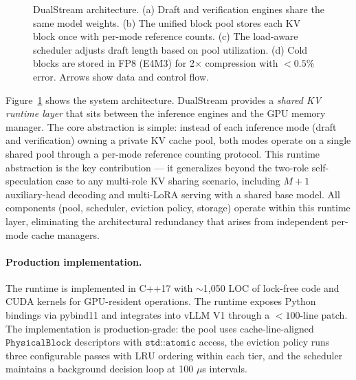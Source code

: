 \documentclass[review]{elsarticle}
\theoremstyle{definition}
\theoremstyle{remark}
\begin{document}
\begin{figure}[t]
\caption{DualStream architecture. (a) Draft and verification engines
share the same model weights. (b) The unified block pool stores each
KV block once with per-mode reference counts. (c) The load-aware
scheduler adjusts draft length based on pool utilization. (d) Cold blocks
are stored in FP8 (E4M3) for 2$\times$ compression with $<0.5\%$ error.
Arrows show data and control flow.}
\label{fig:arch}
\end{figure}

Figure~\ref{fig:arch} shows the system architecture. DualStream provides a
\emph{shared KV runtime layer} that sits between the inference engines and the
GPU memory manager. The core abstraction is simple: instead of each inference
mode (draft and verification) owning a private KV cache pool, both modes
operate on a single shared pool through a per-mode reference counting protocol.
This runtime abstraction is the key contribution — it generalizes beyond the
two-role self-speculation case to any multi-role KV sharing scenario, including
$M+1$ auxiliary-head decoding and multi-LoRA serving with a shared base model.
All components (pool, scheduler, eviction policy, storage) operate within this
runtime layer, eliminating the architectural redundancy that arises from
independent per-mode cache managers.

\paragraph{Production implementation.}
The runtime is implemented in C++17 with $\sim$1,050 LOC of lock-free code and
CUDA kernels for GPU-resident operations. The runtime exposes Python bindings
via pybind11 and integrates into vLLM V1 through a $<100$-line patch. The
implementation is production-grade: the pool uses cache-line-aligned
$\texttt{PhysicalBlock}$ descriptors with $\texttt{std::atomic}$ access, the
eviction policy runs three configurable passes with LRU ordering within each
tier, and the scheduler maintains a background decision loop at 100 $\mu$s
intervals.
\end{document}
